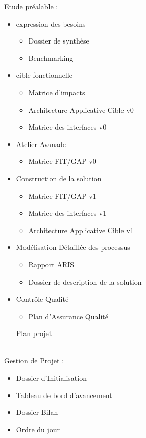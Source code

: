 \documentclass[]{scrartcl}
\begin{document}
Etude préalable : 
\begin{itemize}
\item expression des besoins
\begin{itemize}
\item Dossier de synthèse
\item Benchmarking
\end{itemize}
\item cible fonctionnelle
\begin{itemize}
\item Matrice d'impacts
\item Architecture Applicative Cible v0
\item Matrice des interfaces v0
\end{itemize}
\item Atelier Avanade
\begin{itemize}
\item Matrice FIT/GAP v0
\end{itemize}
\item Construction de la solution
\begin{itemize}
\item Matrice FIT/GAP v1
\item Matrice des interfaces v1
\item Architecture Applicative Cible v1
\end{itemize}
\item Modélisation Détaillée des processus
\begin{itemize}
\item Rapport ARIS
\item Dossier de description de la solution
\end{itemize}
\item Contrôle Qualité
\begin{itemize}
\item Plan d'Assurance Qualité
\end{itemize}
\item [Plan projet]
\end{itemize}
\ \\
Gestion de Projet : 
\begin{itemize}
\item Dossier d'Initialisation
\item Tableau de bord d'avancement
\item Dossier Bilan
\item Ordre du jour
\end{itemize}
\end{document}

